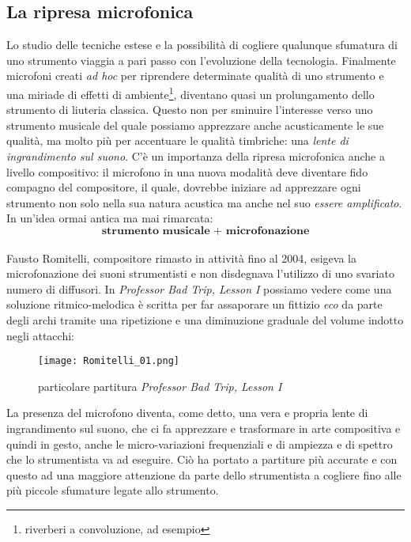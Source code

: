 \subsection{La ripresa microfonica}

Lo studio delle tecniche estese e la possibilità di cogliere qualunque sfumatura di uno strumento viaggia a pari passo con l’evoluzione della tecnologia. Finalmente microfoni creati \textit{ad hoc} per riprendere determinate qualità di uno strumento e una miriade di effetti di ambiente\footnote{riverberi a convoluzione, ad esempio}, diventano quasi un prolungamento dello strumento di liuteria classica. Questo non per sminuire l’interesse verso uno strumento musicale del quale possiamo apprezzare anche acusticamente le sue qualità, ma molto più per accentuare le qualità timbriche: una \textit{lente di ingrandimento sul suono}. C'è un importanza della ripresa microfonica anche a livello compositivo: il microfono in una nuova modalità deve diventare fido compagno del compositore, il quale, dovrebbe iniziare ad apprezzare ogni strumento non solo nella sua natura acustica ma anche nel suo \textit{essere amplificato}. In un’idea ormai antica ma mai rimarcata: \\
\[\textbf{strumento musicale + microfonazione}\] \\
Fausto Romitelli, compositore rimasto in attività fino al 2004, esigeva la microfonazione dei suoni strumentisti e non disdegnava l'utilizzo di uno svariato numero di diffusori. In \textit{Professor Bad Trip, Lesson I} possiamo vedere come una soluzione ritmico-melodica è scritta per far assaporare un fittizio \textit{eco} da parte degli archi tramite una ripetizione e una diminuzione graduale del volume indotto negli attacchi: 
\begin{figure}[htbp]

\begin{center}

\texttt{[image: Romitelli\_01.png]}

\caption{particolare partitura \textit{Professor Bad Trip, Lesson I}}

\label{fig:01_Romitelli}

\end{center}

\end{figure}

La presenza del microfono diventa, come detto, una vera e propria lente di ingrandimento sul suono, che ci fa apprezzare e trasformare in arte compositiva e quindi in gesto, anche le micro-variazioni frequenziali e di ampiezza e di spettro che lo strumentista va ad eseguire. Ciò ha portato a partiture più accurate e con questo ad una maggiore attenzione da parte dello strumentista a cogliere fino alle più piccole sfumature legate allo strumento.

